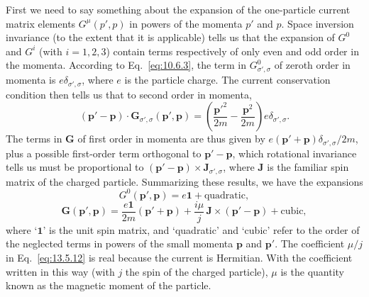 First we need to say something about the expansion of the one-particle
current matrix elements $G^\mu(p',p)$ in powers of the momenta $p'$ and $p$.
Space inversion invariance (to the extent that it is applicable) tells us that
the expansion of $G^0$ and $G^i$ (with $i=1,2,3$) contain terms respectively of
only even and odd order in the momenta. According to Eq.~\eqref{eq:10.6.3}, the
term in $G^0_{\sigma',\sigma}$ of zeroth order in momenta is $e\delta_{\sigma',\sigma}$, where $e$ is the particle
charge. The current conservation condition then tells us that to second
order in momenta,
\begin{equation*}
(\mathbf p'-\mathbf p)\cdot\mathbf G_{\sigma',\sigma}(\mathbf p',\mathbf p)
=\left(\frac{\mathbf p'^2}{2m}-\frac{\mathbf p^2}{2m}\right)e\delta_{\sigma',\sigma}.
\end{equation*}
The terms in $\mathbf G$ of first order in momenta are thus given by
$e(\mathbf p'+\mathbf p)\delta_{\sigma',\sigma}/2m$, plus a possible first-order term orthogonal to
$\mathbf p'-\mathbf p$, which rotational invariance tells us must be proportional to
$(\mathbf p'-\mathbf p)\times\mathbf J_{\sigma',\sigma}$, where $\mathbf J$ is the familiar spin matrix of the charged particle. Summarizing these results,
we have the expansions
\begin{equation}
G^0(\mathbf p',\mathbf p)=e\mathbf{1}+\text{quadratic},
\tag{13.5.11}\label{eq:13.5.11}
\end{equation}
\begin{equation}
\mathbf G(\mathbf p',\mathbf p)
=\frac{e\mathbf{1}}{2m}(\mathbf p'+\mathbf p)
+\frac{i\mu}{j}\,\mathbf J\times(\mathbf p'-\mathbf p)+\text{cubic},
\tag{13.5.12}\label{eq:13.5.12}
\end{equation}
where `$\mathbf{1}$' is the unit spin matrix, and `quadratic' and `cubic' refer to the
order of the neglected terms in powers of the small momenta $\mathbf p$ and $\mathbf p'$. The
coefficient $\mu/j$ in Eq.~\eqref{eq:13.5.12} is real because the current is Hermitian.
With the coefficient written in this way (with $j$ the spin of the charged
particle), $\mu$ is the quantity known as the magnetic moment of the particle.

